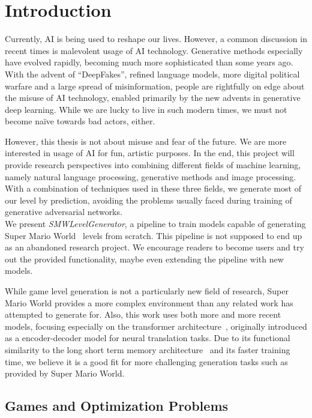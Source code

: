 \section{Introduction}

Currently, AI is being used to reshape our lives. However, a common
discussion in recent times is malevolent usage of AI technology.
Generative methods especially have evolved rapidly, becoming much more
sophisticated than some years ago. With the advent of ``DeepFakes'',
refined language models, more digital political warfare and a large
spread of misinformation, people are rightfully on edge about the
misuse of AI technology, enabled primarily by the new advents in
generative deep learning. While we are lucky to live in such modern
times, we must not become naïve towards bad actors, either.

However, this thesis is not about misuse and fear of the future. We
are more interested in usage of AI for fun, artistic purposes. In the
end, this project will provide research perspectives into combining
different fields of machine learning, namely natural language
processing, generative methods and image processing. With a
combination of techniques used in these three fields, we generate most
of our level by prediction, avoiding the problems usually faced during
training of generative adversarial networks. \\
We present \emph{SMWLevelGenerator}, a pipeline to train models
capable of generating Super Mario World~\cite{SuperMarioWorld2019}
levels from scratch. This pipeline is not supposed to end up as an
abandoned research project. We encourage readers to become users and
try out the provided functionality, maybe even extending the pipeline
with new models.

While game level generation is not a particularly new field of
research, Super Mario World provides a more complex environment than
any related work has attempted to generate for. Also, this work uses
both more and more recent models, focusing especially on the
transformer architecture~\cite{vaswaniAttentionAllYou2017}, originally
introduced as a encoder-decoder model for neural translation tasks.
Due to its functional similarity to the long short term memory
architecture~\cite{hochreiterLongShorttermMemory1997} and its faster
training time, we believe it is a good fit for more challenging
generation tasks such as provided by Super Mario World.

\subsection{Games and Optimization Problems}

